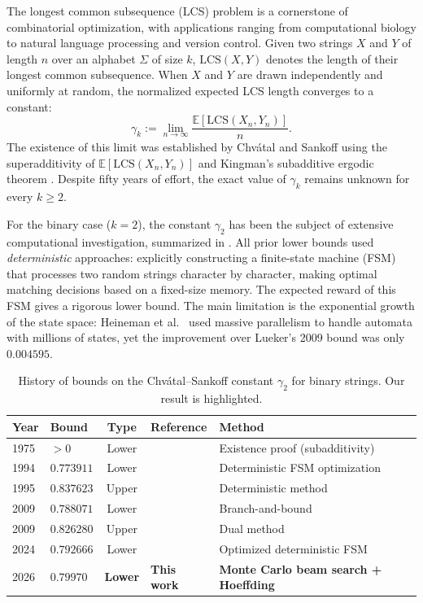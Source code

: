 \documentclass[11pt,a4paper]{article}
\theoremstyle{definition}
\newcommand{\E}{\mathbb{E}}
\newcommand{\LCS}{\mathrm{LCS}}
\begin{document}
The longest common subsequence (LCS) problem is a cornerstone of combinatorial
optimization, with applications ranging from computational biology to natural
language processing and version control. Given two strings $X$ and $Y$ of length
$n$ over an alphabet $\Sigma$ of size $k$, $\LCS(X, Y)$ denotes the length of
their longest common subsequence. When $X$ and $Y$ are drawn independently and
uniformly at random, the normalized expected LCS length converges to a constant:
\begin{equation}
  \gamma_k := \lim_{n \to \infty} \frac{\E[\LCS(X_n, Y_n)]}{n}.
  \label{eq:gamma_k}
\end{equation}
The existence of this limit was established by Chv\'{a}tal and Sankoff
\citep{chvtal1975} using the superadditivity of $\E[\LCS(X_n, Y_n)]$ and
Kingman's subadditive ergodic theorem \citep{kingman1968}. Despite fifty years
of effort, the exact value of $\gamma_k$ remains unknown for every $k \geq 2$.

For the binary case ($k = 2$), the constant $\gamma_2$ has been the subject of
extensive computational investigation, summarized in . All
prior lower bounds used \emph{deterministic} approaches: explicitly constructing
a finite-state machine (FSM) that processes two random strings character by
character, making optimal matching decisions based on a fixed-size memory. The
expected reward of this FSM gives a rigorous lower bound. The main limitation is
the exponential growth of the state space: Heineman et al.\
\citep{heineman2024} used massive parallelism to handle automata with millions
of states, yet the improvement over Lueker's 2009 bound \citep{lueker2009} was
only $0.004595$.

\begin{table}[t]
  \centering
  \caption{History of bounds on the Chv\'{a}tal--Sankoff constant $\gamma_2$
  for binary strings. Our result is highlighted.}
  \label{tab:history}
  \begin{tabular}{@{}llcll@{}}
    \toprule
    Year & Bound & Type & Reference & Method \\
    \midrule
    1975 & $> 0$ & Lower & \citet{chvtal1975} & Existence proof (subadditivity) \\
    1994 & $0.773911$ & Lower & \citet{dancik1994} & Deterministic FSM optimization \\
    1995 & $0.837623$ & Upper & \citet{dancik1995} & Deterministic method \\
    2009 & $0.788071$ & Lower & \citet{lueker2009} & Branch-and-bound \\
    2009 & $0.826280$ & Upper & \citet{lueker2009} & Dual method \\
    2024 & $0.792666$ & Lower & \citet{heineman2024} & Optimized deterministic FSM \\
    \rowcolor{yellow!20}
    2026 & $\mathbf{0.79970}$ & \textbf{Lower} & \textbf{This work} &
      \textbf{Monte Carlo beam search + Hoeffding} \\
    \bottomrule
  \end{tabular}
\end{table}
\end{document}
